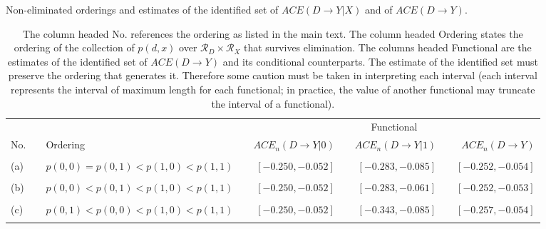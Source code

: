 \documentclass[12pt,a4paper,twoside]{article}
\renewcommand{\baselinestretch}{1.5}
\newcommand{\details}{C:/Users/Jeffro/Dropbox/TeXTemplates/}
\numberwithin{equation}{section}
\begin{document}
\begin{sidewaystable}[p]
\centering
\caption{Non-eliminated orderings and estimates of the identified set of $ACE(D\rightarrow Y|X)$ and of $ACE(D\rightarrow Y)$.}
\begin{tabular}{lclcrcrcr}
\toprule
&	& &	& \multicolumn{5}{c}{Functional} \\
\cmidrule(r){4-9}	
No. & &	Ordering &	&	$ACE_n(D\rightarrow Y|0)$	&	&	$ACE_n(D\rightarrow Y|1)$	&	&	$ACE_n(D\rightarrow Y)$	\\
\midrule
\\
(a)& & $p(0,0)=p(0,1)<p(1,0)<p(1,1)$	&	&	$[-0.250,-0.052]$	&	&	$[-0.283,-0.085]$	&	&	$[-0.252,-0.054]$\\
\\
(b) & &$p(0,0)<p(0,1)<p(1,0)<p(1,1)$	&	&	$[-0.250,-0.052]$	&	&	$[-0.283,-0.061]$	&	&	$[-0.252,-0.053]$\\
\\
(c) & &$p(0,1)<p(0,0)<p(1,0)<p(1,1)$	&	&	$[-0.250,-0.052]$	&	&	$[-0.343,-0.085]$	&	&	$[-0.257,-0.054]$\\
\\
\bottomrule
\end{tabular}
\vspace{10pt}
\renewcommand{\baselinestretch}{1.5}
\caption*{\scriptsize The column headed No. references the ordering as listed in the main text. The column headed Ordering states the ordering of the collection of $p(d,x)$ over $\mathcal{R}_D\times\mathcal{R}_X$ that survives elimination. The columns headed Functional are the estimates of the identified set of $ACE(D\rightarrow Y)$ and its conditional counterparts. The estimate of the identified set must preserve the ordering that generates it. Therefore some caution must be taken in interpreting each interval (each interval represents the interval of maximum length for each functional; in practice, the value of another functional may truncate the interval of a functional).}
\label{tbl:hispmace}
\end{sidewaystable}
\clearpage
\newpage


\end{document}
